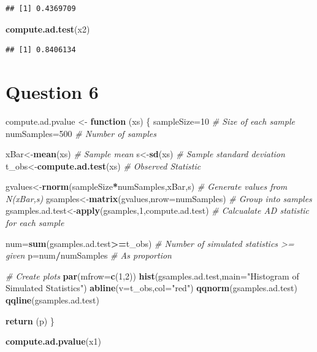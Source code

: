 \documentclass[]{article}
\newenvironment{Shaded}{\begin{snugshade}}{\end{snugshade}}
\newcommand{\CommentTok}[1]{\textcolor[rgb]{0.56,0.35,0.01}{\textit{#1}}}
\newcommand{\ControlFlowTok}[1]{\textcolor[rgb]{0.13,0.29,0.53}{\textbf{#1}}}
\newcommand{\DataTypeTok}[1]{\textcolor[rgb]{0.13,0.29,0.53}{#1}}
\newcommand{\DecValTok}[1]{\textcolor[rgb]{0.00,0.00,0.81}{#1}}
\newcommand{\KeywordTok}[1]{\textcolor[rgb]{0.13,0.29,0.53}{\textbf{#1}}}
\newcommand{\NormalTok}[1]{#1}
\newcommand{\OperatorTok}[1]{\textcolor[rgb]{0.81,0.36,0.00}{\textbf{#1}}}
\newcommand{\StringTok}[1]{\textcolor[rgb]{0.31,0.60,0.02}{#1}}
\begin{document}
\begin{verbatim}
## [1] 0.4369709
\end{verbatim}

\begin{Shaded}
\begin{Highlighting}[]
\KeywordTok{compute.ad.test}\NormalTok{(x2)}
\end{Highlighting}
\end{Shaded}

\begin{verbatim}
## [1] 0.8406134
\end{verbatim}

\hypertarget{question-6}{%
\section{Question 6}\label{question-6}}

\begin{Shaded}
\begin{Highlighting}[]
\NormalTok{compute.ad.pvalue <-}\StringTok{ }\ControlFlowTok{function}\NormalTok{ (xs) \{}
\NormalTok{  sampleSize=}\DecValTok{10}  \CommentTok{# Size of each sample}
\NormalTok{  numSamples=}\DecValTok{500} \CommentTok{# Number of samples}
  
\NormalTok{  xBar<-}\KeywordTok{mean}\NormalTok{(xs)             }\CommentTok{# Sample mean}
\NormalTok{  s<-}\KeywordTok{sd}\NormalTok{(xs)                  }\CommentTok{# Sample standard deviation}
\NormalTok{  t_obs<-}\KeywordTok{compute.ad.test}\NormalTok{(xs) }\CommentTok{# Observed Statistic}
  
\NormalTok{  gvalues<-}\KeywordTok{rnorm}\NormalTok{(sampleSize}\OperatorTok{*}\NormalTok{numSamples,xBar,s)        }\CommentTok{# Generate values from N(xBar,s)}
\NormalTok{  gsamples<-}\KeywordTok{matrix}\NormalTok{(gvalues,}\DataTypeTok{nrow=}\NormalTok{numSamples)           }\CommentTok{# Group into samples}
\NormalTok{  gsamples.ad.test<-}\KeywordTok{apply}\NormalTok{(gsamples,}\DecValTok{1}\NormalTok{,compute.ad.test) }\CommentTok{# Calcualate AD statistic for each sample}
  
\NormalTok{  num=}\KeywordTok{sum}\NormalTok{(gsamples.ad.test}\OperatorTok{>=}\NormalTok{t_obs) }\CommentTok{# Number of simulated statistics >= given}
\NormalTok{  p=num}\OperatorTok{/}\NormalTok{numSamples                 }\CommentTok{# As proportion}
  
  \CommentTok{# Create plots}
  \KeywordTok{par}\NormalTok{(}\DataTypeTok{mfrow=}\KeywordTok{c}\NormalTok{(}\DecValTok{1}\NormalTok{,}\DecValTok{2}\NormalTok{))}
  \KeywordTok{hist}\NormalTok{(gsamples.ad.test,}\DataTypeTok{main=}\StringTok{"Histogram of Simulated Statistics"}\NormalTok{)}
  \KeywordTok{abline}\NormalTok{(}\DataTypeTok{v=}\NormalTok{t_obs,}\DataTypeTok{col=}\StringTok{"red"}\NormalTok{)}
  \KeywordTok{qqnorm}\NormalTok{(gsamples.ad.test)}
  \KeywordTok{qqline}\NormalTok{(gsamples.ad.test)}
  
  \KeywordTok{return}\NormalTok{ (p)}
\NormalTok{\}}

\KeywordTok{compute.ad.pvalue}\NormalTok{(x1)}
\end{Highlighting}
\end{Shaded}
\end{document}
